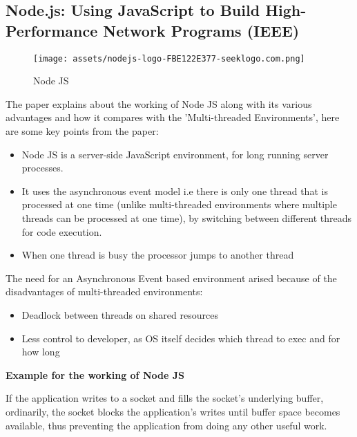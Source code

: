 \documentclass[12pt]{article}
\begin{document}
\subsection{Node.js: Using JavaScript 
to Build High-Performance 
Network Programs (IEEE)}


\begin{figure}[H]
    \centering
    \texttt{[image: assets/nodejs-logo-FBE122E377-seeklogo.com.png]}
    \caption{Node JS}
    \label{fig:logo}
\end{figure}


The paper explains about the working of Node JS along with its various advantages and how it compares with the 'Multi-threaded Environments', here are some key points from the paper:

\begin{itemize}[noitemsep]
  \itemsep0.5em
  
  \item Node JS is a server-side JavaScript environment, for long running server processes.
  \item It uses the asynchronous event model i.e there is only one thread that is processed at one time (unlike multi-threaded environments where multiple threads can be processed at one time), by switching between different threads for code execution.
  \item When one thread is busy the processor jumps to another thread
  
\end{itemize}

The need for an Asynchronous Event based environment arised because of the disadvantages of multi-threaded environments: 

\begin{itemize}[noitemsep]
  \itemsep0.5em
  
  \item Deadlock between threads on shared resources
  \item Less control to developer, as OS itself decides which thread to exec and for how long
  
\end{itemize}

\textbf{Example for the working of Node JS}

\hspace{1cm} If the application writes to a socket and fills the socket’s underlying buffer, ordinarily, the socket blocks the application’s writes until buffer space becomes available, thus preventing the application from doing any other useful work. 
\end{document}
